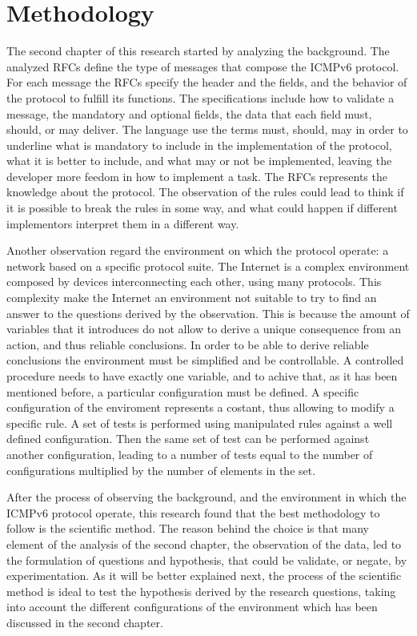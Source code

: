 \documentclass[12pt]{article}
\begin{document}
\pagebreak

\section{Methodology}
\label{sec:3}

The second chapter of this research started by analyzing the background. The analyzed RFCs define the type of messages that compose the ICMPv6 protocol. For each message the RFCs specify the header and the fields, and the behavior of the protocol to fulfill its functions. The specifications include how to validate a message, the mandatory and optional fields, the data that each field must, should, or may deliver. The language use the terms must, should, may in order to underline what is mandatory to include in the implementation of the protocol, what it is better to include, and what may or not be implemented, leaving the developer more feedom in how to implement a task. The RFCs represents the knowledge about the protocol. The observation of the rules could lead to think if it is possible to break the rules in some way, and what could happen if different implementors interpret them in a different way.

Another observation regard the environment on which the protocol operate: a network based on a specific protocol suite. The Internet is a complex environment composed by devices interconnecting each other, using many protocols. This complexity make the Internet an environment not suitable to try to find an answer to the questions derived by the observation. This is because the amount of variables that it introduces do not allow to derive a unique consequence from an action, and thus reliable conclusions. In order to be able to derive reliable conclusions the environment must be simplified and be controllable. A controlled procedure needs to have exactly one variable, and to achive that, as it has been mentioned before, a particular configuration must be defined. A specific configuration of the enviroment represents a costant, thus allowing to modify a specific rule. A set of tests is performed using manipulated rules against a well defined configuration. Then the same set of test can be performed against another configuration, leading to a number of tests equal to the number of configurations multiplied by the number of elements in the set.\cite{secExperiments}

After the process of observing the background, and the environment in which the ICMPv6 protocol operate, this research found that the best methodology to follow is the scientific method. The reason behind the choice is that many element of the analysis of the second chapter, the observation of the data, led to the formulation of questions and hypothesis, that could be validate, or negate, by experimentation. As it will be better explained next, the process of the scientific method is ideal to test the hypothesis derived by the research questions, taking into account the different configurations of the environment which has been discussed in the second chapter.
\end{document}
